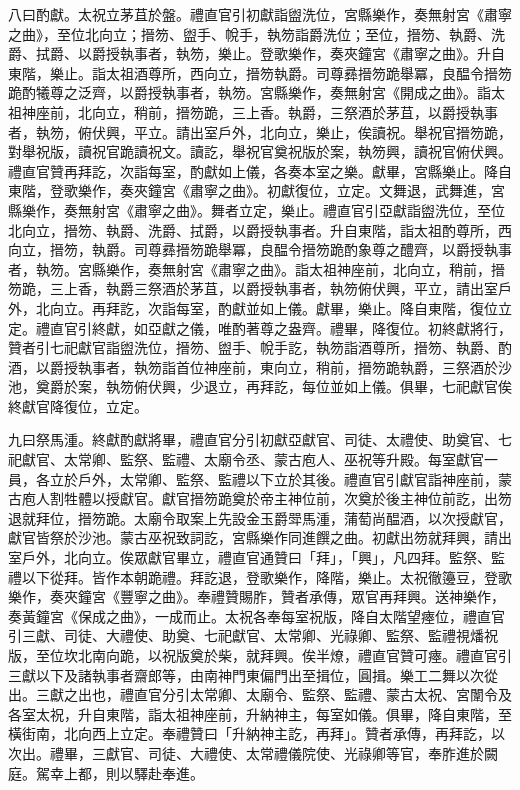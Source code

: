 \begin{pinyinscope}
 八曰酌獻。太祝立茅苴於盤。禮直官引初獻詣盥洗位，宮縣樂作，奏無射宮《肅寧之曲》，至位北向立；搢笏、盥手、帨手，執笏詣爵洗位；至位，搢笏、執爵、洗爵、拭爵、以爵授執事者，執笏，樂止。登歌樂作，奏夾鐘宮《肅寧之曲》。升自東階，樂止。詣太祖酒尊所，西向立，搢笏執爵。司尊彞搢笏跪舉冪，良醖令搢笏跪酌犧尊之泛齊，以爵授執事者，執笏。宮縣樂作，奏無射宮《開成之曲》。詣太祖神座前，北向立，稍前，搢笏跪，三上香。執爵，三祭酒於茅苴，以爵授執事者，執笏，俯伏興，平立。請出室戶外，北向立，樂止，俟讀祝。舉祝官搢笏跪，對舉祝版，讀祝官跪讀祝文。讀訖，舉祝官奠祝版於案，執笏興，讀祝官俯伏興。禮直官贊再拜訖，次詣每室，酌獻如上儀，各奏本室之樂。獻畢，宮縣樂止。降自東階，登歌樂作，奏夾鐘宮《肅寧之曲》。初獻復位，立定。文舞退，武舞進，宮縣樂作，奏無射宮《肅寧之曲》。舞者立定，樂止。禮直官引亞獻詣盥洗位，至位北向立，搢笏、執爵、洗爵、拭爵，以爵授執事者。升自東階，詣太祖酌尊所，西向立，搢笏，執爵。司尊彞搢笏跪舉冪，良醖令搢笏跪酌象尊之醴齊，以爵授執事者，執笏。宮縣樂作，奏無射宮《肅寧之曲》。詣太祖神座前，北向立，稍前，搢笏跪，三上香，執爵三祭酒於茅苴，以爵授執事者，執笏俯伏興，平立，請出室戶外，北向立。再拜訖，次詣每室，酌獻並如上儀。獻畢，樂止。降自東階，復位立定。禮直官引終獻，如亞獻之儀，唯酌著尊之盎齊。禮畢，降復位。初終獻將行，贊者引七祀獻官詣盥洗位，搢笏、盥手、帨手訖，執笏詣酒尊所，搢笏、執爵、酌酒，以爵授執事者，執笏詣首位神座前，東向立，稍前，搢笏跪執爵，三祭酒於沙池，奠爵於案，執笏俯伏興，少退立，再拜訖，每位並如上儀。俱畢，七祀獻官俟終獻官降復位，立定。



 九曰祭馬湩。終獻酌獻將畢，禮直官分引初獻亞獻官、司徒、太禮使、助奠官、七祀獻官、太常卿、監祭、監禮、太廟令丞、蒙古庖人、巫祝等升殿。每室獻官一員，各立於戶外，太常卿、監祭、監禮以下立於其後。禮直官引獻官詣神座前，蒙古庖人割牲體以授獻官。獻官搢笏跪奠於帝主神位前，次奠於後主神位前訖，出笏退就拜位，搢笏跪。太廟令取案上先設金玉爵斝馬湩，蒲萄尚醖酒，以次授獻官，獻官皆祭於沙池。蒙古巫祝致詞訖，宮縣樂作同進饌之曲。初獻出笏就拜興，請出室戶外，北向立。俟眾獻官畢立，禮直官通贊曰「拜」，「興」，凡四拜。監祭、監禮以下從拜。皆作本朝跪禮。拜訖退，登歌樂作，降階，樂止。太祝徹籩豆，登歌樂作，奏夾鐘宮《豐寧之曲》。奉禮贊賜胙，贊者承傳，眾官再拜興。送神樂作，奏黃鐘宮《保成之曲》，一成而止。太祝各奉每室祝版，降自太階望瘞位，禮直官引三獻、司徒、大禮使、助奠、七祀獻官、太常卿、光祿卿、監祭、監禮視燔祝版，至位坎北南向跪，以祝版奠於柴，就拜興。俟半燎，禮直官贊可瘞。禮直官引三獻以下及諸執事者齋郎等，由南神門東偏門出至揖位，圓揖。樂工二舞以次從出。三獻之出也，禮直官分引太常卿、太廟令、監祭、監禮、蒙古太祝、宮闈令及各室太祝，升自東階，詣太祖神座前，升納神主，每室如儀。俱畢，降自東階，至橫街南，北向西上立定。奉禮贊曰「升納神主訖，再拜」。贊者承傳，再拜訖，以次出。禮畢，三獻官、司徒、大禮使、太常禮儀院使、光祿卿等官，奉胙進於闕庭。駕幸上都，則以驛赴奉進。




\end{pinyinscope}
